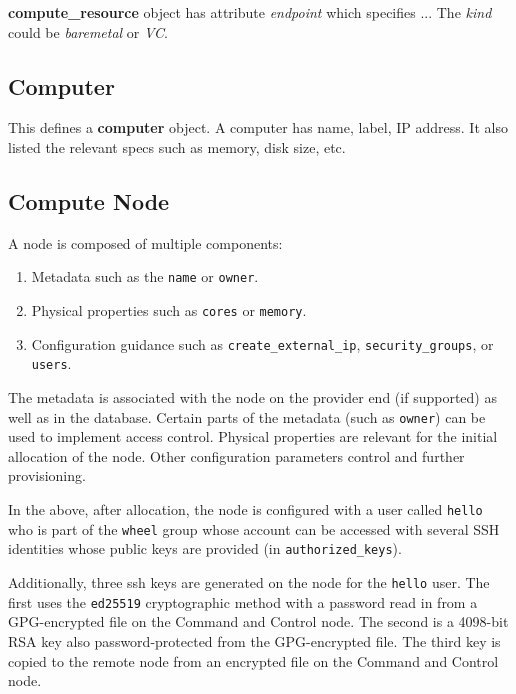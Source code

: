 \documentclass[9pt,twocolumn,twoside]{styles/osajnl}
\begin{document}
\textbf{compute\_resource} object has attribute \textit{endpoint} which
specifies ... The \textit{kind} could be \textit{baremetal} or \textit{VC}.


\subsection{Computer}

This defines a \textbf{computer} object. A computer has name, label,
IP address. It also listed the relevant specs such as memory, disk
size, etc.



\subsection{Compute Node}

A node is composed of multiple components:

\begin{enumerate}
\item Metadata such as the \verb|name| or \verb|owner|.
\item Physical properties such as \verb|cores| or \verb|memory|.
\item Configuration guidance such as \verb|create_external_ip|,
  \verb|security_groups|, or \verb|users|.
\end{enumerate}

The metadata is associated with the node on the provider end (if
supported) as well as in the database. Certain parts of the metadata
(such as \verb|owner|) can be used to implement access
control. Physical properties are relevant for the initial allocation
of the node. Other configuration parameters control and further
provisioning.

In the above, after allocation, the node is configured with a user
called \verb|hello| who is part of the \verb|wheel| group whose
account can be accessed with several SSH identities whose public keys
are provided (in \verb|authorized_keys|).

Additionally, three ssh keys are generated on the node for the
\verb|hello| user. The first uses the \verb|ed25519| cryptographic
method with a password read in from a GPG-encrypted file on the
Command and Control node. The second is a 4098-bit RSA key also
password-protected from the GPG-encrypted file. The third key is
copied to the remote node from an encrypted file on the Command and
Control node.
\end{document}
